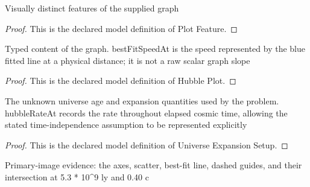 \begin{definition}
  \label{def:physics:phyx-mini-0923:phyxminiproblems-problemphyxmini0923-plotfeature}
  Visually distinct features of the supplied graph
\end{definition}
\begin{proof}
  This is the declared model definition of Plot Feature.
\end{proof}
\begin{definition}
  \label{def:physics:phyx-mini-0923:phyxminiproblems-problemphyxmini0923-hubbleplot}
  Typed content of the graph. bestFitSpeedAt is the speed represented by the blue fitted line at a physical distance; it is not a raw scalar graph slope
\end{definition}
\begin{proof}
  This is the declared model definition of Hubble Plot.
\end{proof}
\begin{definition}
  \label{def:physics:phyx-mini-0923:phyxminiproblems-problemphyxmini0923-universeexpansionsetup}
  The unknown universe age and expansion quantities used by the problem. hubbleRateAt records the rate throughout elapsed cosmic time, allowing the stated time-independence assumption to be represented explicitly
\end{definition}
\begin{proof}
  This is the declared model definition of Universe Expansion Setup.
\end{proof}
\begin{definition}
  \label{def:physics:phyx-mini-0923:phyxminiproblems-problemphyxmini0923-matcheshubbleplotfigure}
  Primary-image evidence: the axes, scatter, best-fit line, dashed guides, and their intersection at 5.3 * 10\textasciicircum{}9 ly and 0.40 c
\end{definition}
